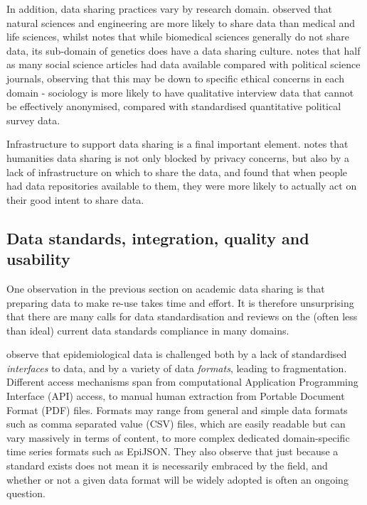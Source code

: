 \documentclass{CUP-JNL-DAP}%
\begin{document}
 In addition, data sharing practices vary by research domain. \cite{Yimei_Zhu_Open_access_in_uk} observed that natural sciences and engineering are more likely to share data than medical and life sciences, whilst \cite{datasharing_rcts} notes that while biomedical sciences generally do not share data, its sub-domain of genetics does have a data sharing culture. \cite{datasharing_sociology} notes that half as many social science articles had data available compared with political science journals, observing that this may be down to specific ethical concerns in each domain - sociology is more likely to have qualitative interview data that cannot be effectively anonymised, compared with standardised quantitative political survey data. 

Infrastructure to support data sharing is a final important element. \cite{Yimei_Zhu_Open_access_in_uk} notes that humanities data sharing is not only blocked by privacy concerns, but also by a lack of infrastructure on which to share the data, and \cite{Kim_Zhang_data_repos} found that when people had data repositories available to them, they were more likely to actually act on their good intent to share data.

\subsection{Data standards, integration, quality and usability}

One observation in the previous section on academic data sharing is that preparing data to make re-use takes time and effort. It is therefore unsurprising that there are many calls for data standardisation and reviews on the (often less than ideal) current data standards compliance in many domains.  

\cite{fairchild_epidemiological_2018} observe that epidemiological data is challenged both by a lack of standardised \textit{interfaces} to data, and by a variety of data \textit{formats}, leading to fragmentation. Different access mechanisms span from computational Application Programming Interface (API) access, to manual human extraction from Portable Document Format (PDF) files. Formats may range from general and simple data formats such as comma separated value (CSV) files, which are easily readable but can vary massively in terms of content, to more complex dedicated domain-specific time series formats such as EpiJSON. They also observe that just because a standard exists does not mean it is necessarily embraced by the field, and whether or not a given data format will be widely adopted is often an ongoing question. 
\end{document}
